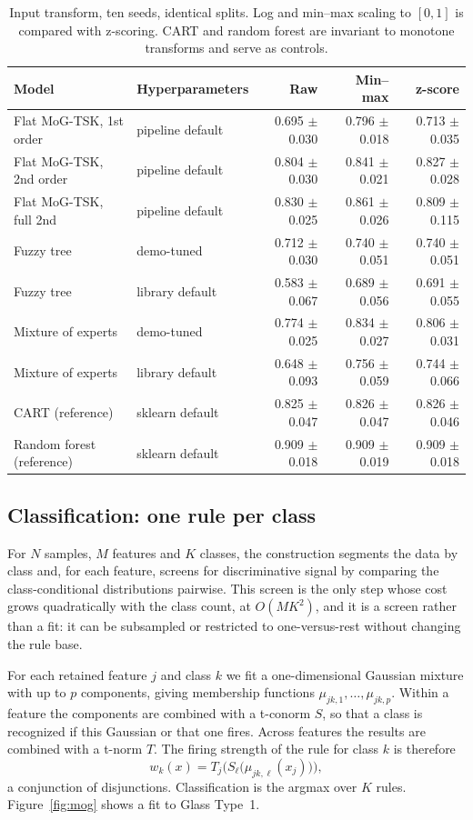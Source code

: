 \documentclass[journal]{IEEEtran}
\begin{document}
\begin{table}[t]
\centering
\caption{Input transform, ten seeds, identical splits. Log and min--max scaling to $[0,1]$ is compared with z-scoring. CART and random forest are invariant to monotone transforms and serve as controls.}
\label{tab:transform}
\begin{tabular}{llrrr}
\toprule
Model & Hyperparameters & Raw & Min--max & z-score \\
\midrule
Flat MoG-TSK, 1st order & pipeline default & 0.695 $\pm$ 0.030 & 0.796 $\pm$ 0.018 & 0.713 $\pm$ 0.035 \\
Flat MoG-TSK, 2nd order & pipeline default & 0.804 $\pm$ 0.030 & 0.841 $\pm$ 0.021 & 0.827 $\pm$ 0.028 \\
Flat MoG-TSK, full 2nd & pipeline default & 0.830 $\pm$ 0.025 & 0.861 $\pm$ 0.026 & 0.809 $\pm$ 0.115 \\
Fuzzy tree & demo-tuned & 0.712 $\pm$ 0.030 & 0.740 $\pm$ 0.051 & 0.740 $\pm$ 0.051 \\
Fuzzy tree & library default & 0.583 $\pm$ 0.067 & 0.689 $\pm$ 0.056 & 0.691 $\pm$ 0.055 \\
Mixture of experts & demo-tuned & 0.774 $\pm$ 0.025 & 0.834 $\pm$ 0.027 & 0.806 $\pm$ 0.031 \\
Mixture of experts & library default & 0.648 $\pm$ 0.093 & 0.756 $\pm$ 0.059 & 0.744 $\pm$ 0.066 \\
CART (reference) & sklearn default & 0.825 $\pm$ 0.047 & 0.826 $\pm$ 0.047 & 0.826 $\pm$ 0.046 \\
Random forest (reference) & sklearn default & 0.909 $\pm$ 0.018 & 0.909 $\pm$ 0.019 & 0.909 $\pm$ 0.018 \\
\bottomrule
\end{tabular}
\end{table}

\subsection{Classification: one rule per class}
For $N$ samples, $M$ features and $K$ classes, the construction segments the data by class and, for each feature, screens for discriminative signal by comparing the class-conditional distributions pairwise. This screen is the only step whose cost grows quadratically with the class count, at $O(MK^2)$, and it is a screen rather than a fit: it can be subsampled or restricted to one-versus-rest without changing the rule base.

For each retained feature $j$ and class $k$ we fit a one-dimensional Gaussian mixture with up to $p$ components, giving membership functions $\mu_{jk,1},\dots,\mu_{jk,p}$. Within a feature the components are combined with a t-conorm $S$, so that a class is recognized if this Gaussian or that one fires. Across features the results are combined with a t-norm $T$. The firing strength of the rule for class $k$ is therefore
\begin{equation}
w_k(x) = T_{j}\Big(S_{\ell}\big(\mu_{jk,\ell}(x_j)\big)\Big),
\end{equation}
a conjunction of disjunctions. Classification is the argmax over $K$ rules. Figure~\ref{fig:mog} shows a fit to Glass Type~1.
\end{document}

